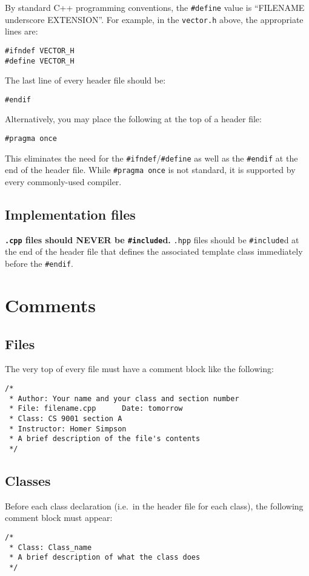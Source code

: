 \documentclass{article}
\newcommand{\code}[1]{\texttt{\colorbox{gray!30}{#1}}}
\begin{document}
By standard C++ programming conventions, the \code{\#define} value is ``FILENAME underscore EXTENSION''.
For example, in the \code{vector.h} above, the appropriate lines are:

\begin{lstlisting}
#ifndef VECTOR_H
#define VECTOR_H
\end{lstlisting}

The last line of every header file should be:

\begin{lstlisting}
#endif
\end{lstlisting}

Alternatively, you may place the following at the top of a header file:
\begin{lstlisting}
#pragma once
\end{lstlisting}

This eliminates the need for the \code{\#ifndef}/\code{\#define} as well as the \code{\#endif} at the end of the header file.
While \code{\#pragma once} is not standard, it is supported by every commonly-used compiler.

\subsection{Implementation files}
\textbf{\code{.cpp} files should NEVER be \code{\#include}d.}
\code{.hpp} files should be \code{\#include}d at the end of the header file that defines the associated template class immediately before the \code{\#endif}.

\section{Comments}

\subsection{Files}
The very top of every file must have a comment block like the following:
\begin{lstlisting}
/*
 * Author: Your name and your class and section number
 * File: filename.cpp      Date: tomorrow
 * Class: CS 9001 section A
 * Instructor: Homer Simpson
 * A brief description of the file's contents
 */
\end{lstlisting}

\subsection{Classes}
Before each class declaration (i.e.\ in the header file for each class), the following comment block must appear:
\begin{lstlisting}
/*
 * Class: Class_name
 * A brief description of what the class does
 */
\end{lstlisting}
\end{document}
